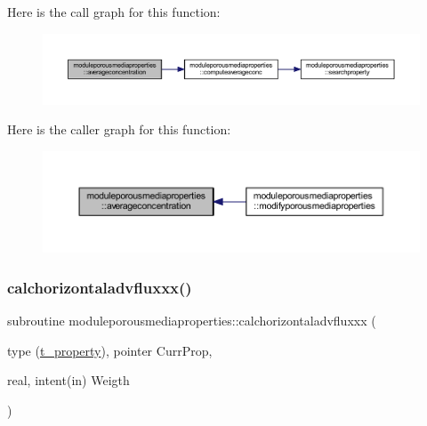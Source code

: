 Here is the call graph for this function\+:\nopagebreak
\begin{figure}[H]
\begin{center}
\leavevmode
\includegraphics[width=350pt]{namespacemoduleporousmediaproperties_aa717037551efabb3abaec9e2f610d0f3_cgraph}
\end{center}
\end{figure}
Here is the caller graph for this function\+:\nopagebreak
\begin{figure}[H]
\begin{center}
\leavevmode
\includegraphics[width=350pt]{namespacemoduleporousmediaproperties_aa717037551efabb3abaec9e2f610d0f3_icgraph}
\end{center}
\end{figure}
\mbox{\label{namespacemoduleporousmediaproperties_a5723fa1fcf71ee69d8401d06efd65372}} 
\subsubsection{\texorpdfstring{calchorizontaladvfluxxx()}{calchorizontaladvfluxxx()}}
{\footnotesize\ttfamily subroutine moduleporousmediaproperties\+::calchorizontaladvfluxxx (\begin{DoxyParamCaption}\item[{type (\mbox{\hyperlink{structmoduleporousmediaproperties_1_1t__property}{t\+\_\+property}}), pointer}]{Curr\+Prop,  }\item[{real, intent(in)}]{Weigth }\end{DoxyParamCaption})\hspace{0.3cm}{\ttfamily [private]}}

